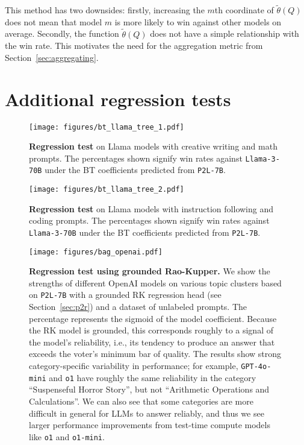 This method has two downsides: firstly, increasing the $m$th coordinate of $\tilde{\theta}(Q)$ does not mean that model $m$ is more likely to win against other models on average.
Secondly, the function $\tilde\theta(Q)$ does not have a simple relationship with the win rate.
This motivates the need for the aggregation metric from Section~\ref{sec:aggregating}.


\section{Additional regression tests}
\label{app:more-strength-weakness}

\begin{figure}[H]
    \centering
    \texttt{[image: figures/bt\_llama\_tree\_1.pdf]}
    \caption{\textbf{Regression test} on Llama models with creative writing and math prompts.  The percentages shown signify win rates against \texttt{Llama-3-70B} under the BT coefficients predicted from \texttt{P2L-7B}.}
    \label{fig:llama-regression-1}
\end{figure}


\begin{figure}[H]
    \centering
    \texttt{[image: figures/bt\_llama\_tree\_2.pdf]}
    \caption{\textbf{Regression test} on Llama models with instruction following and coding prompts. The percentages shown signify win rates against \texttt{Llama-3-70B} under the BT coefficients predicted from \texttt{P2L-7B}.}
    \label{fig:llama-regression-2}
\end{figure}

\begin{figure}[H]
    \centering
    \texttt{[image: figures/bag\_openai.pdf]}
    \caption{\textbf{Regression test using grounded Rao-Kupper.} We show the strengths of different OpenAI models on various topic clusters based on \texttt{P2L-7B} with a grounded RK regression head (see Section~\ref{sec:p2r}) and a dataset of unlabeled prompts. The percentage represents the sigmoid of the model coefficient.
    Because the RK model is grounded, this corresponds roughly to a signal of the model's reliability, i.e., its tendency to produce an answer that exceeds the voter's minimum bar of quality. The results show strong category-specific variability in performance; for example, \texttt{GPT-4o-mini} and \texttt{o1} have roughly the same reliability in the category ``Suspenseful Horror Story'', but not ``Arithmetic Operations and Calculations''. We can also see that some categories are more difficult in general for LLMs to answer reliably, and thus we see larger performance improvements from test-time compute models like \texttt{o1} and \texttt{o1-mini}.}
    \label{fig:analysis-grounded-rk}
\end{figure}

